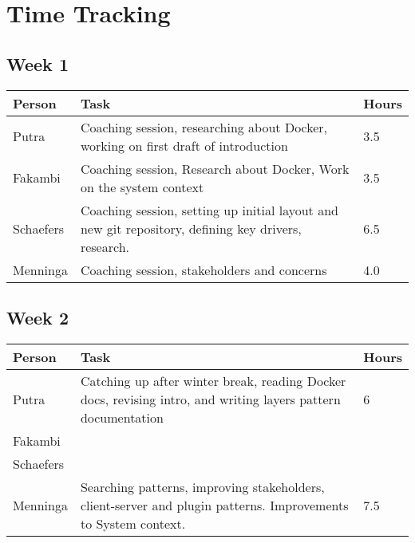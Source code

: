 \chapter{Time Tracking}
\label{App: Time Tracking}

\section*{Week 1}
\begin{longtable}{p{} p{} p{}}
	\textbf{Person} & \textbf{Task} & \textbf{Hours} \\ \toprule
	Putra           & Coaching session, researching about Docker, working on first draft of introduction 	& 3.5	\\ \midrule
	Fakambi         & Coaching session, Research about Docker, Work on the system context & 3.5	\\ \midrule
	Schaefers       & Coaching session, setting up initial layout and new git repository, defining key drivers, research. &  6.5 	\\ \midrule
	Menninga        & Coaching session, stakeholders and concerns & 4.0 \\ \bottomrule
\end{longtable}

\section*{Week 2}
\begin{longtable}{p{} p{} p{}}
	\textbf{Person} & \textbf{Task} & \textbf{Hours} \\ \toprule
	Putra           & Catching up after winter break, reading Docker docs, revising intro, and writing layers pattern documentation & 6	\\ \midrule
	Fakambi         & & \\ \midrule
	Schaefers       & & \\ \midrule
	Menninga        & Searching patterns, improving stakeholders, client-server and plugin patterns. Improvements to System context. & 7.5 \\ \bottomrule
\end{longtable}